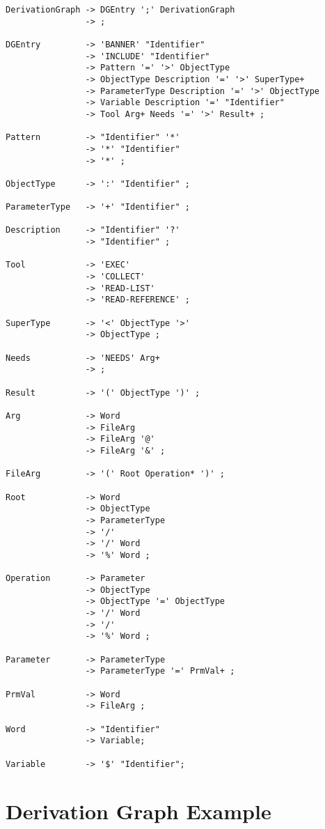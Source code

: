\documentclass[hidelinks]{report}
\begin{document}
\begin{verbatim}
DerivationGraph -> DGEntry ';' DerivationGraph
                -> ;

DGEntry         -> 'BANNER' "Identifier"
                -> 'INCLUDE' "Identifier"
                -> Pattern '=' '>' ObjectType
                -> ObjectType Description '=' '>' SuperType+
                -> ParameterType Description '=' '>' ObjectType
                -> Variable Description '=' "Identifier"
                -> Tool Arg+ Needs '=' '>' Result+ ;

Pattern         -> "Identifier" '*'
                -> '*' "Identifier"
                -> '*' ;

ObjectType      -> ':' "Identifier" ;

ParameterType   -> '+' "Identifier" ;

Description     -> "Identifier" '?'
                -> "Identifier" ;

Tool            -> 'EXEC'
                -> 'COLLECT'
                -> 'READ-LIST'
                -> 'READ-REFERENCE' ;

SuperType       -> '<' ObjectType '>'
                -> ObjectType ;

Needs           -> 'NEEDS' Arg+
                -> ;

Result          -> '(' ObjectType ')' ;

Arg             -> Word
                -> FileArg
                -> FileArg '@'
                -> FileArg '&' ;

FileArg         -> '(' Root Operation* ')' ;

Root            -> Word
                -> ObjectType
                -> ParameterType
                -> '/'
                -> '/' Word
                -> '%' Word ;

Operation       -> Parameter
                -> ObjectType
                -> ObjectType '=' ObjectType
                -> '/' Word
                -> '/'
                -> '%' Word ;

Parameter       -> ParameterType
                -> ParameterType '=' PrmVal+ ;

PrmVal          -> Word
                -> FileArg ;

Word            -> "Identifier"
                -> Variable;

Variable        -> '$' "Identifier";
\end{verbatim}


\chapter{Derivation Graph Example}
\end{document}
